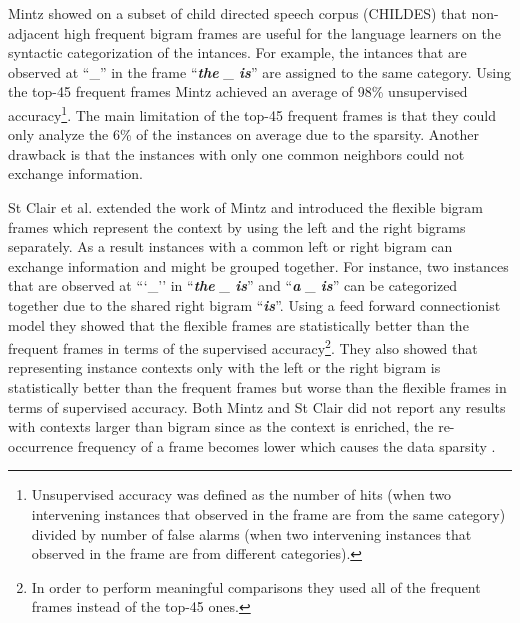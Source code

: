 Mintz  showed on a subset of child
directed speech corpus (CHILDES) \cite{macwhinney2000childes} that
non-adjacent high frequent bigram frames are useful for the language
learners on the syntactic categorization of the intances.  For example,
the intances that are observed at ``\_'' in the frame ``{\em {\bf the}
  \_ {\bf is}}'' are assigned to the same category.  Using the top-45
frequent frames Mintz achieved an average of 98\% unsupervised
accuracy\footnote{Unsupervised accuracy was defined as the number of
  hits (when two intervening instances that observed in the frame are
  from the same category) divided by number of false alarms (when two
  intervening instances that observed in the frame are from different
  categories).}.  The main limitation of the top-45 frequent frames is
that they could only analyze the 6\% of the instances on average due to
the sparsity.  Another drawback is that the instances with only one
common neighbors could not exchange information.

St Clair et al.   extended the work of Mintz
 and introduced the flexible bigram
frames which represent the context by using the left and the right
bigrams separately.  As a result instances with a common left or right
bigram can exchange information and might be grouped together.  For
instance, two instances that are observed at ```\_'' in ``{\em {\bf the}
  \_ {\bf is}}'' and ``{\em {\bf a} \_ {\bf is}}'' can be categorized
together due to the shared right bigram ``{\em{\bf is}}''.  Using a
feed forward connectionist model they showed that the flexible frames
are statistically better than the frequent frames in terms of the
supervised accuracy\footnote{In order to perform meaningful
  comparisons they used all of the frequent frames instead of the
  top-45 ones.}.  They also showed that representing instance contexts
only with the left or the right bigram is statistically better than
the frequent frames but worse than the flexible frames in terms of
supervised accuracy.  Both Mintz  and St
Clair  did not report any results with contexts
larger than bigram since as the context is enriched, the re-occurrence
frequency of a frame becomes lower which causes the data sparsity
\cite{manning99foundations}.

